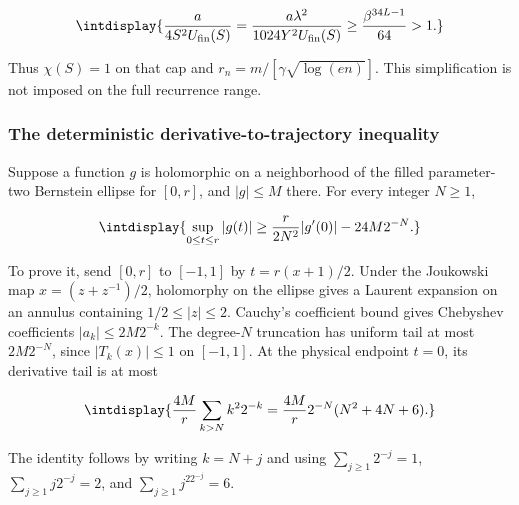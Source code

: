 \begingroup\renewcommand{\theHequation}{intdisplay.499}
\begin{equation*}
\intdisplay{
\frac{a}{4S^2U_{\rm fin}(S)}
=\frac{a\lambda^2}{1024Y^2U_{\rm fin}(S)}
\ge\frac{\beta^{34L-1}}{64}>1.
}
\end{equation*}
\endgroup


Thus \(\chi(S)=1\) on that cap and \(r_n=m/[\gamma\sqrt{\log(en)}]\). This simplification is not imposed on the full recurrence range.


\subsubsection{The deterministic derivative-to-trajectory inequality}



Suppose a function \(g\) is holomorphic on a neighborhood of the filled parameter-two Bernstein ellipse for \([0,\allowbreak r]\), and \(|g|\le M\) there. For every integer \(N\ge1\),


\begingroup\renewcommand{\theHequation}{intdisplay.500}
\begin{equation*}
\intdisplay{
\sup_{0\le t\le r}|g(t)|
\ge\frac r{2N^2}|g'(0)|-24M2^{-N}.
}
\end{equation*}
\endgroup


To prove it, send \([0,\allowbreak r]\) to \([-1,\allowbreak 1]\) by \(t=r(x+1)/2\). Under the Joukowski map \(x=(z+z^{-1})/2\), holomorphy on the ellipse gives a Laurent expansion on an annulus containing \(1/2\le|z|\le2\). Cauchy's coefficient bound gives Chebyshev coefficients \(|a_k|\le2M2^{-k}\). The degree-\(N\) truncation has uniform tail at most \(2M2^{-N}\), since \(|T_k(x)|\le1\) on \([-1,\allowbreak 1]\). At the physical endpoint \(t=0\), its derivative tail is at most


\begingroup\renewcommand{\theHequation}{intdisplay.501}
\begin{equation*}
\intdisplay{
\frac{4M}{r}\sum_{k>N}k^22^{-k}
=\frac{4M}{r}2^{-N}(N^2+4N+6).
}
\end{equation*}
\endgroup


The identity follows by writing \(k=N+j\) and using \(\sum_{j\ge1}2^{-j}=1\), \(\sum_{j\ge1}j2^{-j}=2\), and \(\sum_{j\ge1}j^22^{-j}=6\).


